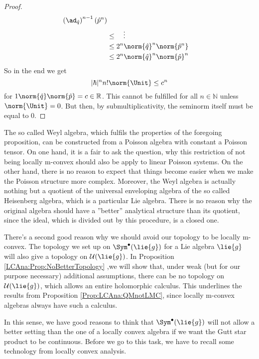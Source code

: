 \begin{proof}
\begin{align*}
{			\left( \ad_{\hat{q}} \right)^{n-1}
			(\hat{p}^n)
		}
		\\
		& \leq
		\quad \vdots
		\\
		& \leq
		2^n \norm{\hat{q}}^n
		\norm{ \hat{p}^n }
		\\
		& \leq
		2^n 
		\norm{\hat{q}}^n
		\norm{\hat{p}}^n
	\end{align*}
	So in the end we get
	\begin{equation*}
		|\hbar|^n n! \norm{ \Unit }
		\leq
		c^n
	\end{equation*}
	for $1 \norm{\hat q} \norm{\hat p} = c \in \mathbb{R}$. This cannot be 
	fulfilled for all $n \in \mathbb{N}$ unless $\norm{ \Unit } = 0$. But 
	then, by submultiplicativity, the seminorm itself must be equal to $0$.
\end{proof}
\begin{remark}
	The so called Weyl algebra, which fulfils the properties of the 
	foregoing proposition, can be constructed from a Poisson algebra with 
	constant a Poisson tensor. On one hand, it is a fair to ask the question, 
	why this restriction of not being locally m-convex should also be apply to
	linear Poisson systems. On the other hand, there is no reason to 
	expect that things become easier when we make the Poisson structure more 
	complex. Moreover, the Weyl algebra is actually nothing but a 
	quotient of the universal enveloping algebra of the so called 
	Heisenberg algebra, which is a particular Lie algebra. There is 
	no reason why the original algebra should have a ''better'' analytical 
	structure than its quotient, since the ideal, which is divided out by 
	this procedure, is a closed one.
\end{remark}
There's a second good reason why we should avoid our topology to be locally 
m-convex. The topology we set up on $\Sym^{\bullet}(\lie{g})$ for a Lie 
algebra $\lie{g}$ will also give a topology on $\mathcal{U}(\lie{g})$.
In Proposition \ref{LCAna:Prop:NoBetterTopology} ,we will show that, under 
weak (but for our purpose necessary) additional assumptions, there can be no 
topology on $\mathcal{U}(\lie{g})$, which allows an entire holomorphic 
calculus. This underlines the results from Proposition 
\ref{Prop:LCAna:QMnotLMC}, since locally m-convex algebras always have such a 
calculus.


In this sense, we have good reasons to think that 
$\Sym^{\bullet}(\lie{g})$ will not allow a better setting than the
one of a locally convex algebra if we want the Gutt star product to 
be continuous. Before we go to this task, we have to recall some
technology from locally convex analysis.



